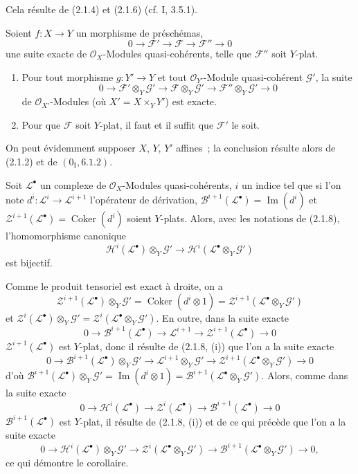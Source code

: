 Cela résulte de (2.1.4) et (2.1.6) (cf. I, 3.5.1).

\begin{proposition}[2.1.8]
\label{IV.2.1.8-fr}
Soient $f:X\to Y$ un morphisme de préschémas,
\[
0\to\mathscr F'\to\mathscr F\to\mathscr F''\to0
\]
une suite exacte de $\mathcal O_X$-Modules quasi-cohérents, telle que
$\mathscr F''$ soit $Y$-plat.
\begin{enumerate}
\item[(i)] Pour tout morphisme $g:Y'\to Y$ et tout $\mathcal O_{Y'}$-Module
quasi-cohérent $\mathscr G'$, la suite
\[
0\to\mathscr F'\otimes_Y\mathscr G'\to
\mathscr F\otimes_Y\mathscr G'\to
\mathscr F''\otimes_Y\mathscr G'\to0
\]
de $\mathcal O_{X'}$-Modules (où $X'=X\times_Y Y'$) est exacte.
\item[(ii)] Pour que $\mathscr F$ soit $Y$-plat, il faut et il suffit que
$\mathscr F'$ le soit.
\end{enumerate}
\end{proposition}

On peut évidemment supposer $X$, $Y$, $Y'$ affines~; la conclusion résulte
alors de (2.1.2) et de $(0_{\mathrm I},6.1.2)$.

\begin{corollary}[2.1.9]
\label{IV.2.1.9-fr}
Soit $\mathscr L^\bullet$ un complexe de $\mathcal O_X$-Modules
quasi-cohérents, $i$ un indice tel que si l'on note
$d^i:\mathscr L^i\to\mathscr L^{i+1}$ l'opérateur de dérivation,
$\mathscr B^{i+1}(\mathscr L^\bullet)=\operatorname{Im}(d^i)$ et
$\mathscr Z^{i+1}(\mathscr L^\bullet)=\operatorname{Coker}(d^i)$ soient
$Y$-plats. Alors, avec les notations de (2.1.8), l'homomorphisme canonique
\[
\mathscr H^i(\mathscr L^\bullet)\otimes_Y\mathscr G'
\longrightarrow
\mathscr H^i(\mathscr L^\bullet\otimes_Y\mathscr G')
\]
est bijectif.
\end{corollary}

Comme le produit tensoriel est exact à droite, on a
\[
\mathscr Z^{i+1}(\mathscr L^\bullet)\otimes_Y\mathscr G'
=\operatorname{Coker}(d^i\otimes1)
=\mathscr Z^{i+1}(\mathscr L^\bullet\otimes_Y\mathscr G')
\]
et
$\mathscr Z^i(\mathscr L^\bullet)\otimes_Y\mathscr G'
=\mathscr Z^i(\mathscr L^\bullet\otimes_Y\mathscr G')$. En outre, dans la
suite exacte
\[
0\to\mathscr B^{i+1}(\mathscr L^\bullet)\to\mathscr L^{i+1}
\to\mathscr Z^{i+1}(\mathscr L^\bullet)\to0
\]
$\mathscr Z^{i+1}(\mathscr L^\bullet)$ est $Y$-plat, donc il résulte de
(2.1.8, (i)) que l'on a la suite exacte
\[
0\to\mathscr B^{i+1}(\mathscr L^\bullet)\otimes_Y\mathscr G'
\to\mathscr L^{i+1}\otimes_Y\mathscr G'
\to\mathscr Z^{i+1}(\mathscr L^\bullet\otimes_Y\mathscr G')\to0
\]
d'où
$\mathscr B^{i+1}(\mathscr L^\bullet)\otimes_Y\mathscr G'
=\operatorname{Im}(d^i\otimes1)
=\mathscr B^{i+1}(\mathscr L^\bullet\otimes_Y\mathscr G')$. Alors, comme
dans la suite exacte
\[
0\to\mathscr H^i(\mathscr L^\bullet)\to\mathscr Z^i(\mathscr L^\bullet)
\to\mathscr B^{i+1}(\mathscr L^\bullet)\to0
\]
$\mathscr B^{i+1}(\mathscr L^\bullet)$ est $Y$-plat, il résulte de
(2.1.8, (i)) et de ce qui précède que l'on a la suite exacte
\[
0\to\mathscr H^i(\mathscr L^\bullet)\otimes_Y\mathscr G'
\to\mathscr Z^i(\mathscr L^\bullet\otimes_Y\mathscr G')
\to\mathscr B^{i+1}(\mathscr L^\bullet\otimes_Y\mathscr G')\to0,
\]
ce qui démontre le corollaire.

